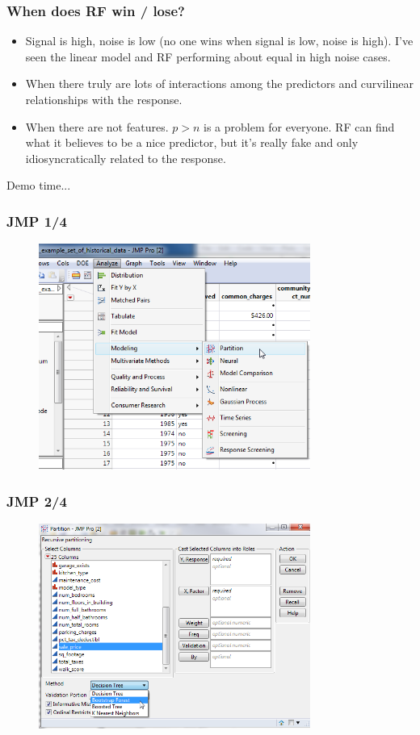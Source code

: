 \documentclass[handout]{beamer}
\begin{document}
\begin{frame}\frametitle{When does RF win / lose?}
\pause
\begin{itemize}
\item Signal is high, noise is low (no one wins when signal is low, noise is high). I've seen the linear model and RF performing about equal in high noise cases. \pause
\item When there truly are lots of interactions among the predictors and curvilinear relationships with the response. \pause
\item When there are not  features. $p > n$ is a problem for everyone. RF can find what it believes to be a nice predictor, but it's really fake and only idiosyncratically related to the response.
\end{itemize}

Demo time...

\end{frame}

\begin{frame}\frametitle{JMP 1/4}

\begin{figure}
\centering
\includegraphics[width=3.5in]{jmp01.png}
\end{figure}
\end{frame}


\begin{frame}\frametitle{JMP 2/4}

\begin{figure}
\centering
\includegraphics[width=3.5in]{jmp02.png}
\end{figure}
	
\end{frame}
\end{document}
